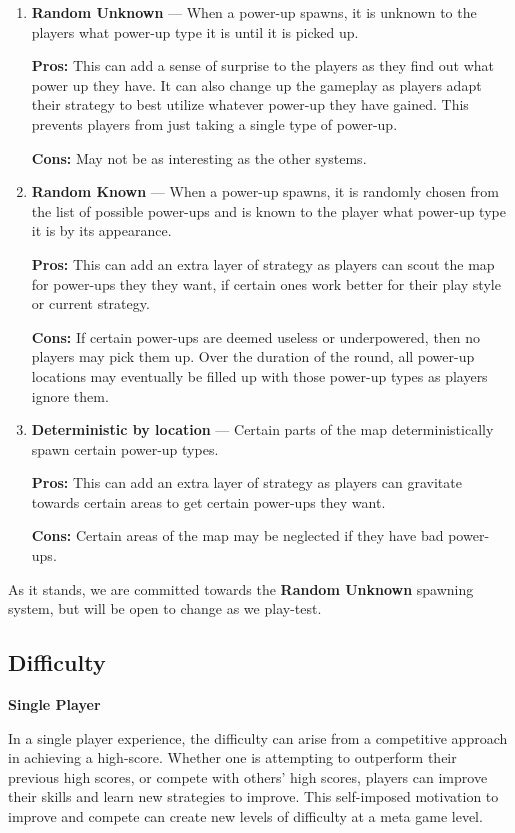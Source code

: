 \documentclass{article}
\theoremstyle{definition}
\begin{document}
\begin{enumerate}
  \item \textbf{Random Unknown} --- When a power-up spawns, it is unknown to
    the players what power-up type it is until it is picked up.

    \textbf{Pros:} This can add a sense of surprise to the players as they find
    out what power up they have. It can also change up the gameplay as players
    adapt their strategy to best utilize whatever power-up they have gained.
    This prevents players from just taking a single type of power-up.

    \textbf{Cons:} May not be as interesting as the other systems.
  \item \textbf{Random Known} --- When a power-up spawns, it is randomly chosen
    from the list of possible power-ups and is known to the player what
    power-up type it is by its appearance.

    \textbf{Pros:} This can add an extra layer of strategy as players can
    scout the map for power-ups they they want, if certain ones work better
    for their play style or current strategy.

    \textbf{Cons:} If certain power-ups are deemed useless or underpowered,
    then no players may pick them up. Over the duration of the round, all
    power-up locations may eventually be filled up with those power-up types as
    players ignore them.
  \item \textbf{Deterministic by location} --- Certain parts of the map
    deterministically spawn certain power-up types.

    \textbf{Pros:} This can add an extra layer of strategy as players can
    gravitate towards certain areas to get certain power-ups they want.

    \textbf{Cons:} Certain areas of the map may be neglected if they have bad
    power-ups.
\end{enumerate}

As it stands, we are committed towards the \textbf{Random Unknown} spawning
system, but will be open to change as we play-test.

\subsection{Difficulty}

\textbf{Single Player}

In a single player experience, the difficulty can arise
from a competitive approach in achieving a high-score. Whether one is
attempting to outperform their previous high scores, or compete with others'
high scores, players can improve their skills and learn new strategies to
improve. This self-imposed motivation to improve and compete can create new
levels of difficulty at a meta game level.
\end{document}
